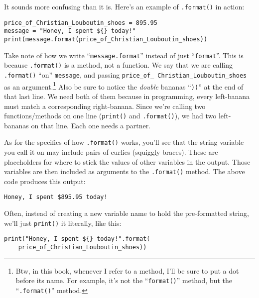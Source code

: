 It sounds more confusing than it is. Here's an example of \texttt{.format()} in
action:

\begin{Verbatim}[fontsize=\small,samepage=true,frame=single,framesep=3mm]
price_of_Christian_Louboutin_shoes = 895.95
message = "Honey, I spent ${} today!"
print(message.format(price_of_Christian_Louboutin_shoes))
\end{Verbatim}

Take note of how we write ``\texttt{message.format}'' instead of just
``\texttt{format}''. This is because \texttt{.format()} is a method, not a
function. We say that we are calling \texttt{.format()} ``on''
\texttt{message}, and passing \texttt{price\_of\_}\ \texttt{Christian\_Louboutin\_shoes}
as an argument.\footnote{Btw, in this book, whenever I refer to a method, I'll
be sure to put a dot before its name. For example, it's not the
``\texttt{format()}'' method, but the ``\texttt{.format()}'' method.} Also be
sure to notice the \textit{double} bananas ``\texttt{))}'' at the end of that
last line. We need both of them because in programming, every left-banana must
match a corresponding right-banana. Since we're calling two functions/methods
on one line (\texttt{print()} and \texttt{.format()}), we had two left-bananas
on that line. Each one needs a partner.

As for the specifics of how \texttt{.format()} works, you'll see that the
string variable you call it on may include pairs of curlies (squiggly braces).
These are placeholders for where to stick the values of other variables in the
output. Those variables are then included as arguments to the
\texttt{.format()} method. The above code produces this output:

\begin{Verbatim}[fontsize=\small,samepage=true,frame=leftline,framesep=5mm,framerule=1mm]
Honey, I spent $895.95 today!
\end{Verbatim}

Often, instead of creating a new variable name to hold the pre-formatted
string, we'll just \texttt{print()} it literally, like this:

\begin{Verbatim}[fontsize=\footnotesize,samepage=true,frame=single,framesep=3mm]
print("Honey, I spent ${} today!".format(
    price_of_Christian_Louboutin_shoes))
\end{Verbatim}

